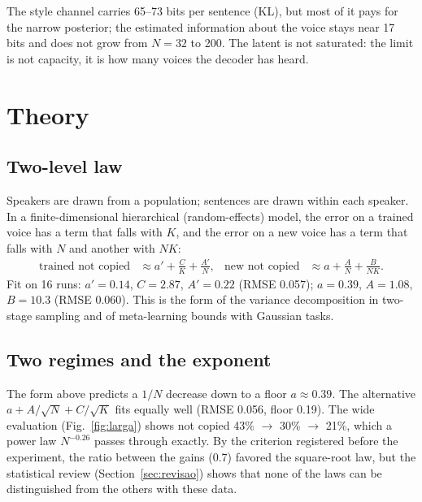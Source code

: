 \documentclass[a4paper,11pt]{article}
\begin{document}
The style channel carries 65--73 bits per sentence (KL), but most of it pays for the narrow posterior; the estimated information about the voice stays near 17 bits and does not grow from $N=32$ to 200. The latent is not saturated: the limit is not capacity, it is how many voices the decoder has heard.

\section{Theory}

\subsection{Two-level law}

Speakers are drawn from a population; sentences are drawn within each speaker. In a finite-dimensional hierarchical (random-effects) model, the error on a trained voice has a term that falls with $K$, and the error on a new voice has a term that falls with $N$ and another with $NK$:
\begin{align*}
\text{trained not copied} &\approx a' + \frac{C}{K} + \frac{A'}{N}, &
\text{new not copied} &\approx a + \frac{A}{N} + \frac{B}{NK}.
\end{align*}
Fit on 16 runs: $a'=0.14$, $C=2.87$, $A'=0.22$ (RMSE 0.057); $a=0.39$, $A=1.08$, $B=10.3$ (RMSE 0.060). This is the form of the variance decomposition in two-stage sampling and of meta-learning bounds with Gaussian tasks.

\subsection{Two regimes and the exponent}

The form above predicts a $1/N$ decrease down to a floor $a\approx0.39$. The alternative $a + A/\sqrt N + C/\sqrt K$ fits equally well (RMSE 0.056, floor 0.19). The wide evaluation (Fig.~\ref{fig:larga}) shows not copied 43\% $\rightarrow$ 30\% $\rightarrow$ 21\%, which a power law $N^{-0.26}$ passes through exactly. By the criterion registered before the experiment, the ratio between the gains (0.7) favored the square-root law, but the statistical review (Section~\ref{sec:revisao}) shows that none of the laws can be distinguished from the others with these data.
\end{document}
